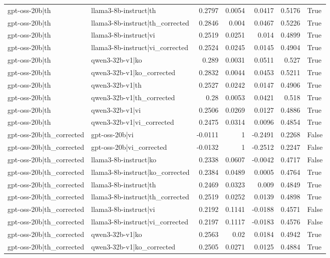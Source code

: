 \begin{table}
\begin{tabular}{l l r r r r l}
gpt-oss-20b|th & llama3-8b-instruct|th & 0.2797 & 0.0054 & 0.0417 & 0.5176 & True \\
gpt-oss-20b|th & llama3-8b-instruct|th_corrected & 0.2846 & 0.004 & 0.0467 & 0.5226 & True \\
gpt-oss-20b|th & llama3-8b-instruct|vi & 0.2519 & 0.0251 & 0.014 & 0.4899 & True \\
gpt-oss-20b|th & llama3-8b-instruct|vi_corrected & 0.2524 & 0.0245 & 0.0145 & 0.4904 & True \\
gpt-oss-20b|th & qwen3-32b-v1|ko & 0.289 & 0.0031 & 0.0511 & 0.527 & True \\
gpt-oss-20b|th & qwen3-32b-v1|ko_corrected & 0.2832 & 0.0044 & 0.0453 & 0.5211 & True \\
gpt-oss-20b|th & qwen3-32b-v1|th & 0.2527 & 0.0242 & 0.0147 & 0.4906 & True \\
gpt-oss-20b|th & qwen3-32b-v1|th_corrected & 0.28 & 0.0053 & 0.0421 & 0.518 & True \\
gpt-oss-20b|th & qwen3-32b-v1|vi & 0.2506 & 0.0269 & 0.0127 & 0.4886 & True \\
gpt-oss-20b|th & qwen3-32b-v1|vi_corrected & 0.2475 & 0.0314 & 0.0096 & 0.4854 & True \\
gpt-oss-20b|th_corrected & gpt-oss-20b|vi & -0.0111 & 1 & -0.2491 & 0.2268 & False \\
gpt-oss-20b|th_corrected & gpt-oss-20b|vi_corrected & -0.0132 & 1 & -0.2512 & 0.2247 & False \\
gpt-oss-20b|th_corrected & llama3-8b-instruct|ko & 0.2338 & 0.0607 & -0.0042 & 0.4717 & False \\
gpt-oss-20b|th_corrected & llama3-8b-instruct|ko_corrected & 0.2384 & 0.0489 & 0.0005 & 0.4764 & True \\
gpt-oss-20b|th_corrected & llama3-8b-instruct|th & 0.2469 & 0.0323 & 0.009 & 0.4849 & True \\
gpt-oss-20b|th_corrected & llama3-8b-instruct|th_corrected & 0.2519 & 0.0252 & 0.0139 & 0.4898 & True \\
gpt-oss-20b|th_corrected & llama3-8b-instruct|vi & 0.2192 & 0.1141 & -0.0188 & 0.4571 & False \\
gpt-oss-20b|th_corrected & llama3-8b-instruct|vi_corrected & 0.2197 & 0.1117 & -0.0183 & 0.4576 & False \\
gpt-oss-20b|th_corrected & qwen3-32b-v1|ko & 0.2563 & 0.02 & 0.0184 & 0.4942 & True \\
gpt-oss-20b|th_corrected & qwen3-32b-v1|ko_corrected & 0.2505 & 0.0271 & 0.0125 & 0.4884 & True \\

\end{tabular}
\end{table}
